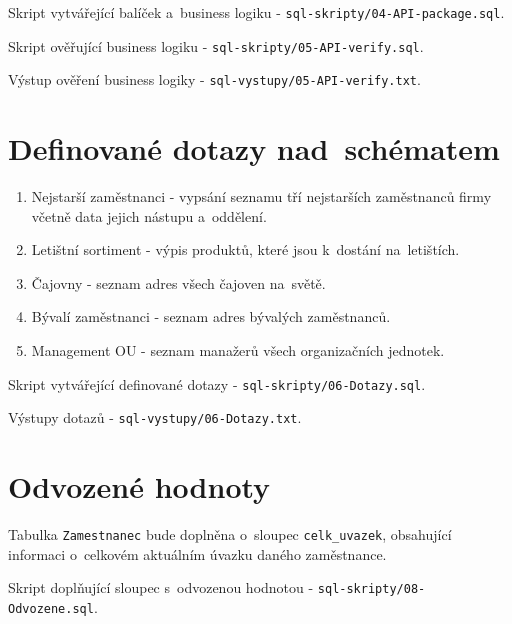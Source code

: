 \documentclass[a4paper,10pt]{article}
\begin{document}
\par Skript vytvářející balíček a~business logiku - \texttt{sql-skripty/04-API-package.sql}.
\par Skript ověřující business logiku - \texttt{sql-skripty/05-API-verify.sql}.
\par Výstup ověření business logiky - \texttt{sql-vystupy/05-API-verify.txt}.


\section{Definované dotazy nad~schématem}

\begin{enumerate}
	\item{Nejstarší zaměstnanci - vypsání seznamu tří nejstarších zaměstnanců firmy včetně
	data jejich nástupu a~oddělení.}
	\item{Letištní sortiment - výpis produktů, které jsou k~dostání na~letištích.}
	\item{Čajovny - seznam adres všech čajoven na~světě.}
	\item{Bývalí zaměstnanci - seznam adres bývalých zaměstnanců.}
	\item{Management OU - seznam manažerů všech organizačních jednotek.}
\end{enumerate}

\par Skript vytvářející definované dotazy - \texttt{sql-skripty/06-Dotazy.sql}.
\par Výstupy dotazů - \texttt{sql-vystupy/06-Dotazy.txt}.


\section{Odvozené hodnoty}

\par Tabulka \texttt{Zamestnanec} bude doplněna o~sloupec \texttt{celk\_uvazek},
obsahující informaci o~celkovém aktuálním úvazku daného zaměstnance. \\ 

\par Skript doplňující sloupec s~odvozenou hodnotou - \texttt{sql-skripty/08-Odvozene.sql}.
\end{document}
